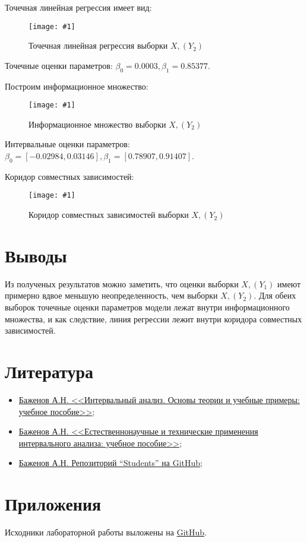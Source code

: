 \documentclass[a4paper,12pt]{article}
\newcommand{\plot}[3]{
  \begin{figure}[H]
    \begin{center}
      \texttt{[image: \#1]}
      \caption{#2}
      \label{#3}
    \end{center}
  \end{figure}
}
\begin{document}
Точечная линейная регрессия имеет вид:
\plot{./images/Regression X, (Y2).png}{Точечная линейная регрессия выборки $ X, (Y_2) $}{p:regY2}

Точечные оценки параметров: $ \beta_0 = 0.0003, \beta_1 = 0.85377 $.

Построим информационное множество:
\plot{./images/Inform X, (Y2).png}{Информационное множество выборки $ X, (Y_2) $}{p:infY2}

Интервальные оценки параметров: $ \beta_0 = [-0.02984, 0.03146],
\beta_1 = [0.78907, 0.91407] $.

Коридор совместных зависимостей:
\plot{./images/Corridor X, (Y2).png}{Коридор совместных зависимостей выборки $ X, (Y_2) $}{p:corY2}

\section{Выводы}
\quad Из полученых результатов можно заметить, что оценки выборки $ X, (Y_1) $
имеют примерно вдвое меньшую неопределенность, чем выборки $ X, (Y_2) $. Для
обеих выборок точечные оценки параметров модели лежат внутри информационного
множества, и как следствие, линия регрессии лежит внутри коридора совместных
зависимостей.

\section{Литература}
\begin{itemize}
  \item \href{https://elib.spbstu.ru/dl/2/s20-76.pdf/info}{Баженов А.Н.
    <<Интервальный анализ. Основы теории и учебные примеры: учебное пособие>>};
  \item \href{https://elib.spbstu.ru/dl/5/tr/2021/tr21-169.pdf/info}{Баженов
      А.Н. <<Естественнонаучные и технические применения интервального анализа:
    учебное пособие>>};
  \item \href{https://github.com/AlexanderBazhenov/Students}{Баженов А.Н.
    Репозиторий ``Students'' на GitHub};
\end{itemize}

\section{Приложения}
\quad Исходники лабораторной работы выложены на
\href{https://github.com/MeShootIn/interval-analysis/tree/lab-2}{GitHub}.
\end{document}

